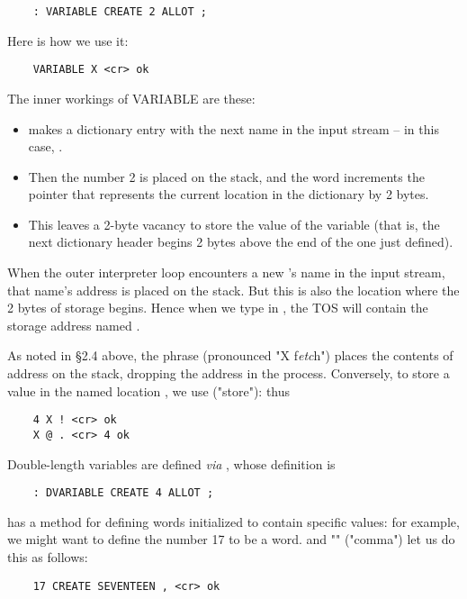 \begin{lstlisting}
    : VARIABLE CREATE 2 ALLOT ;
\end{lstlisting}

Here is how we use it:
\begin{lstlisting}
    VARIABLE X <cr> ok
\end{lstlisting}

The inner workings of VARIABLE are these:
\begin{itemize}
    \item {} makes a dictionary entry with the next name in the input stream -- in this case, .
    \item Then the number 2 is placed on the stack, and the word  increments the pointer that represents the current location in the dictionary by 2 bytes.
    \item This leaves a 2-byte vacancy to store the value of the variable (that is, the next dictionary header begins 2 bytes above the end of the one just defined).
\end{itemize}

When the outer interpreter loop encounters a new 's name in the input stream, that name’s address is placed on the stack. But this is also the location where the 2 bytes of storage begins. Hence when we type in , the TOS will contain the storage address named .

As noted in \S2.4 above, the phrase  (pronounced "X f\textit{etc}h") places the contents of address  on the stack, dropping the address in the process. Conversely, to store a value in the named location , we use \bc{!} ("store"): thus
\begin{lstlisting}
    4 X ! <cr> ok
    X @ . <cr> 4 ok
\end{lstlisting}

Double-length variables are defined \textit{via} , whose definition is

\begin{lstlisting}
    : DVARIABLE CREATE 4 ALLOT ;
\end{lstlisting}

 has a method for defining words initialized to contain specific values: for example, we might want to define the number 17 to be a word.  and "\bc{,}" ("comma") let us do this as follows:

\begin{lstlisting}
    17 CREATE SEVENTEEN , <cr> ok
\end{lstlisting}

